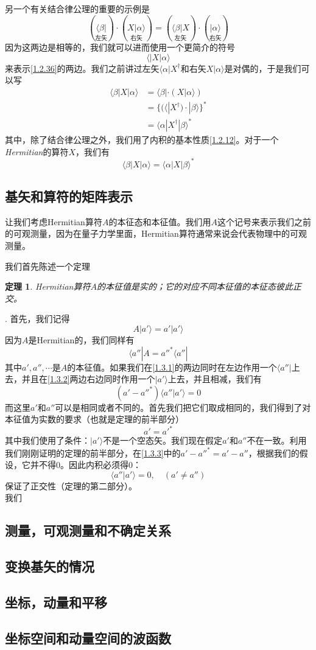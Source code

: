 \documentclass[UTF8,twoside]{ctexart}
\newtheorem{theo}{定理}[section]
\def\be{\begin{equation}}
\def\ee{\end{equation}}
\begin{document}
另一个有关结合律公理的重要的示例是
\be\label{1.2.36}
(\underset{\text{左矢}}{\langle\beta|})\cdot(\underset{\text{右矢}}{X|\alpha\rangle}) = (\underset{\text{左矢}}{\langle\beta|X})\cdot(\underset{\text{右矢}}{|\alpha\rangle})
\ee
因为这两边是相等的，我们就可以进而使用一个更简介的符号
\be
\langle|X|\alpha\rangle
\ee
来表示\eqref{1.2.36}的两边。我们之前讲过左矢$\langle\alpha|X^\dagger$和右矢$X|\alpha\rangle$是对偶的，于是我们可以写
\be
\begin{split}
\langle\beta|X|\alpha\rangle& = \langle\beta|\cdot(X|\alpha\rangle)\\
&=\{(\langle|X^\dagger)\cdot|\beta\rangle\}^*\\
&=\langle\alpha|X^\dagger|\beta\rangle^*
\end{split}
\ee
其中，除了结合律公理之外，我们用了内积的基本性质\eqref{1.2.12}。对于一个{\it Hermitian}的算符$X$，我们有
\be
\langle\beta|X|\alpha\rangle = \langle\alpha|X|\beta\rangle^*
\ee



\subsection{基矢和算符的矩阵表示}


\noindent 让我们考虑Hermitian算符$A$的本征态和本征值。我们用$A$这个记号来表示我们之前的可观测量，因为在量子力学里面，Hermitian算符通常来说会代表物理中的可观测量。

我们首先陈述一个定理

\begin{theo}
Hermitian算符$A$的本征值是实的；它的对应不同本征值的本征态彼此正交。
\end{theo}

. 首先，我们记得
\be\label{1.3.1}
A|a'\rangle = a'|a'\rangle
\ee
因为$A$是Hermitian的，我们同样有
\be\label{1.3.2}
\langle a''|A = a''^*\langle a''|
\ee
其中$a',a'',\cdots$是$A$的本征值。如果我们在\eqref{1.3.1}的两边同时在左边作用一个$\langle a''|$上去，并且在\eqref{1.3.2}两边右边同时作用一个$|a'\rangle$上去，并且相减，我们有
\be\label{1.3.3}
(a'-a''^*)\langle a''|a'\rangle = 0
\ee
而这里$a'$和$a''$可以是相同或者不同的。首先我们把它们取成相同的，我们得到了对本征值为实数的要求（也就是定理的前半部分）
\be
a' = a'^*
\ee
其中我们使用了条件：$|a'\rangle$不是一个空态矢。我们现在假定$a'$和$a''$不在一致。利用我们刚刚证明的定理的前半部分，在\eqref{1.3.3}中的$a'-a''^*=a'-a''$，根据我们的假设，它并不得$0$。因此内积必须得$0$：
\be
\langle a''|a'\rangle = 0,\quad (a' \neq a'')
\ee
保证了正交性（定理的第二部分）。\ \\

我们


\subsection{测量，可观测量和不确定关系}
\subsection{变换基矢的情况}
\subsection{坐标，动量和平移} \label{s1.6}
\subsection{坐标空间和动量空间的波函数}
\end{document}
